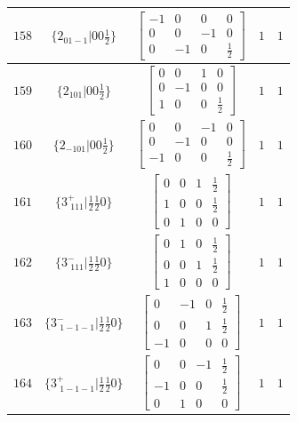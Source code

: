 \documentclass[fleqn,8pt]{jsarticle}
\begin{document}
\begin{longtable}{ccccc}
$ 158 $ & $ \{2{}_{01-1}|0 0 \frac{1}{2}\} $ & $ \begin{bmatrix} -1 & 0 & 0 & 0 \\ 0 & 0 & -1 & 0 \\ 0 & -1 & 0 & \frac{1}{2} \end{bmatrix} $ & $ 1 $ & $ 1 $ \\ \hline
$ 159 $ & $ \{2{}_{101}|0 0 \frac{1}{2}\} $ & $ \begin{bmatrix} 0 & 0 & 1 & 0 \\ 0 & -1 & 0 & 0 \\ 1 & 0 & 0 & \frac{1}{2} \end{bmatrix} $ & $ 1 $ & $ 1 $ \\ \hline
$ 160 $ & $ \{2{}_{-101}|0 0 \frac{1}{2}\} $ & $ \begin{bmatrix} 0 & 0 & -1 & 0 \\ 0 & -1 & 0 & 0 \\ -1 & 0 & 0 & \frac{1}{2} \end{bmatrix} $ & $ 1 $ & $ 1 $ \\ \hline
$ 161 $ & $ \{3^{+}_{\,\,111}|\frac{1}{2} \frac{1}{2} 0\} $ & $ \begin{bmatrix} 0 & 0 & 1 & \frac{1}{2} \\ 1 & 0 & 0 & \frac{1}{2} \\ 0 & 1 & 0 & 0 \end{bmatrix} $ & $ 1 $ & $ 1 $ \\ \hline
$ 162 $ & $ \{3^{-}_{\,\,111}|\frac{1}{2} \frac{1}{2} 0\} $ & $ \begin{bmatrix} 0 & 1 & 0 & \frac{1}{2} \\ 0 & 0 & 1 & \frac{1}{2} \\ 1 & 0 & 0 & 0 \end{bmatrix} $ & $ 1 $ & $ 1 $ \\ \hline
$ 163 $ & $ \{3^{-}_{\,\,1-1-1}|\frac{1}{2} \frac{1}{2} 0\} $ & $ \begin{bmatrix} 0 & -1 & 0 & \frac{1}{2} \\ 0 & 0 & 1 & \frac{1}{2} \\ -1 & 0 & 0 & 0 \end{bmatrix} $ & $ 1 $ & $ 1 $ \\ \hline
$ 164 $ & $ \{3^{+}_{\,\,1-1-1}|\frac{1}{2} \frac{1}{2} 0\} $ & $ \begin{bmatrix} 0 & 0 & -1 & \frac{1}{2} \\ -1 & 0 & 0 & \frac{1}{2} \\ 0 & 1 & 0 & 0 \end{bmatrix} $ & $ 1 $ & $ 1 $ \\ \hline

\end{longtable}
\end{document}
